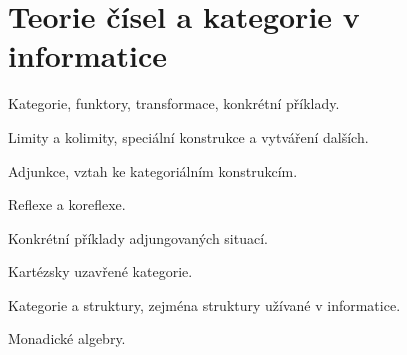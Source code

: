 \newpage
\section{Teorie čísel a kategorie v informatice}
\begin{pozadavky}
\begin{pitemize}
\item Kategorie, funktory, transformace, konkrétní příklady.
\item Limity a kolimity, speciální konstrukce a vytváření dalších.
\item Adjunkce, vztah ke kategoriálním konstrukcím.
\item Reflexe a koreflexe.
\item Konkrétní příklady adjungovaných situací.
\item Kartézsky uzavřené kategorie.
\item Kategorie a struktury, zejména struktury užívané v informatice.
\item Monadické algebry.
\end{pitemize}
\end{pozadavky}
